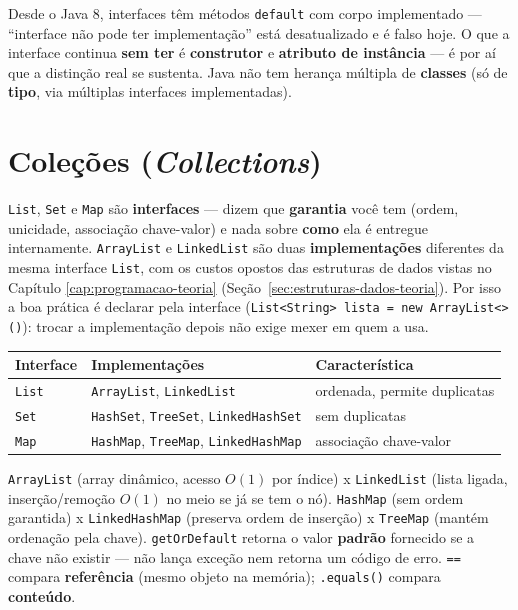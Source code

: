 \begin{cuidado}
Desde o Java 8, interfaces têm métodos \texttt{default} com corpo
implementado --- “interface não pode ter implementação” está
desatualizado e é falso hoje. O que a interface continua \textbf{sem
ter} é \textbf{construtor} e \textbf{atributo de instância} --- é por aí
que a distinção real se sustenta. Java não tem herança múltipla de
\textbf{classes} (só de \textbf{tipo}, via múltiplas interfaces
implementadas).
\end{cuidado}

\section{Coleções (\textit{Collections})}

\begin{conceito}
\texttt{List}, \texttt{Set} e \texttt{Map} são \textbf{interfaces} ---
dizem que \textbf{garantia} você tem (ordem, unicidade, associação
chave-valor) e nada sobre \textbf{como} ela é entregue internamente.
\texttt{ArrayList} e \texttt{LinkedList} são duas \textbf{implementações}
diferentes da mesma interface \texttt{List}, com os custos opostos das
estruturas de dados vistas no Capítulo \ref{cap:programacao-teoria}
(Seção~\ref{sec:estruturas-dados-teoria}). Por isso a boa prática é
declarar pela interface (\texttt{List<String> lista = new
ArrayList<>()}): trocar a implementação depois não exige mexer em quem a
usa.

\begin{center}
\begin{tabular}{@{}p{2.2cm}p{3.8cm}p{4cm}@{}}
\toprule
\textbf{Interface} & \textbf{Implementações} & \textbf{Característica} \\
\midrule
\texttt{List} & \texttt{ArrayList}, \texttt{LinkedList} & ordenada,
permite duplicatas \\
\texttt{Set} & \texttt{HashSet}, \texttt{TreeSet}, \texttt{LinkedHashSet}
& sem duplicatas \\
\texttt{Map} & \texttt{HashMap}, \texttt{TreeMap}, \texttt{LinkedHashMap}
& associação chave-valor \\
\bottomrule
\end{tabular}
\end{center}

\texttt{ArrayList} (array dinâmico, acesso $O(1)$ por índice) x
\texttt{LinkedList} (lista ligada, inserção/remoção $O(1)$ no meio se já
se tem o nó). \texttt{HashMap} (sem ordem garantida) x
\texttt{LinkedHashMap} (preserva ordem de inserção) x \texttt{TreeMap}
(mantém ordenação pela chave). \texttt{getOrDefault} retorna o valor
\textbf{padrão} fornecido se a chave não existir --- não lança exceção
nem retorna um código de erro. \texttt{==} compara \textbf{referência}
(mesmo objeto na memória); \texttt{.equals()} compara \textbf{conteúdo}.
\end{conceito}

